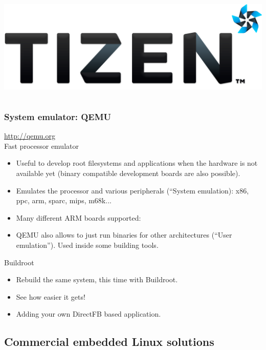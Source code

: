 \begin{frame}
\begin{columns}
    \includegraphics[width=\textwidth]{slides/sysdev-embedded-linux/tizen.png}\\
  \end{columns}
\end{frame}

\begin{frame}
  \frametitle{System emulator: QEMU}
  \url{http://qemu.org}\\
  Fast processor emulator
  \begin{itemize}
  \item Useful to develop root filesystems and applications when the
    hardware is not available yet (binary compatible development
    boards are also possible).
  \item Emulates the processor and various peripherals (“System
    emulation): x86, ppc, arm, sparc, mips, m68k...
  \item Many different ARM boards supported:\\
  \item QEMU also allows to just run binaries for other architectures
    (``User emulation''). Used inside some building tools.
  \end{itemize}
\end{frame}

\setuplabframe
{Buildroot}
{
  \begin{itemize}
  \item Rebuild the same system, this time with Buildroot.
  \item See how easier it gets!
  \item Adding your own DirectFB based application.
  \end{itemize}
}

\subsection{Commercial embedded Linux solutions}

